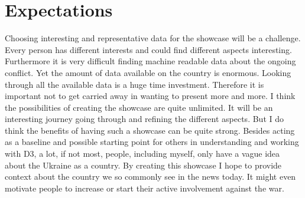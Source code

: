 \documentclass[
a4paper,     %
12pt         %
]{scrartcl}  %
\begin{document}
\section{Expectations}
Choosing interesting and representative data for the showcase will be a challenge. Every person has different interests and could find different aspects interesting. Furthermore it is very difficult finding machine readable data about the ongoing conflict. Yet the amount of data available on the country is enormous. Looking through all the available data is a huge time investment. Therefore it is important not to get carried away in wanting to present more and more.
I think the possibilities of creating the showcase are quite unlimited. It will be an interesting journey going through and refining the different aspects. But I do think the benefits of having such a showcase can be quite strong. Besides acting as a baseline and possible starting point for others in understanding and working with D3, a lot, if not most, people, including myself, only have a vague idea about the Ukraine as a country. By creating this showcase I hope to provide context about the country we so commonly see in the news today. It might even motivate people to increase or start their active involvement against the war.




% 

% 
\end{document}
